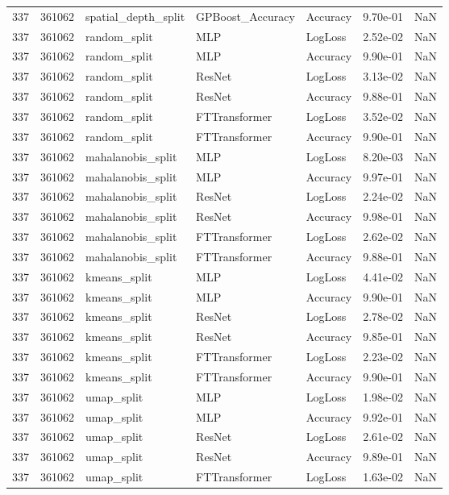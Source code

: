\begin{tabular}{rrlllrr}
337 & 361062 & spatial\_depth\_split & GPBoost\_Accuracy & Accuracy & 9.70e-01 & NaN \\
337 & 361062 & random\_split & MLP & LogLoss & 2.52e-02 & NaN \\
337 & 361062 & random\_split & MLP & Accuracy & 9.90e-01 & NaN \\
337 & 361062 & random\_split & ResNet & LogLoss & 3.13e-02 & NaN \\
337 & 361062 & random\_split & ResNet & Accuracy & 9.88e-01 & NaN \\
337 & 361062 & random\_split & FTTransformer & LogLoss & 3.52e-02 & NaN \\
337 & 361062 & random\_split & FTTransformer & Accuracy & 9.90e-01 & NaN \\
337 & 361062 & mahalanobis\_split & MLP & LogLoss & 8.20e-03 & NaN \\
337 & 361062 & mahalanobis\_split & MLP & Accuracy & 9.97e-01 & NaN \\
337 & 361062 & mahalanobis\_split & ResNet & LogLoss & 2.24e-02 & NaN \\
337 & 361062 & mahalanobis\_split & ResNet & Accuracy & 9.98e-01 & NaN \\
337 & 361062 & mahalanobis\_split & FTTransformer & LogLoss & 2.62e-02 & NaN \\
337 & 361062 & mahalanobis\_split & FTTransformer & Accuracy & 9.88e-01 & NaN \\
337 & 361062 & kmeans\_split & MLP & LogLoss & 4.41e-02 & NaN \\
337 & 361062 & kmeans\_split & MLP & Accuracy & 9.90e-01 & NaN \\
337 & 361062 & kmeans\_split & ResNet & LogLoss & 2.78e-02 & NaN \\
337 & 361062 & kmeans\_split & ResNet & Accuracy & 9.85e-01 & NaN \\
337 & 361062 & kmeans\_split & FTTransformer & LogLoss & 2.23e-02 & NaN \\
337 & 361062 & kmeans\_split & FTTransformer & Accuracy & 9.90e-01 & NaN \\
337 & 361062 & umap\_split & MLP & LogLoss & 1.98e-02 & NaN \\
337 & 361062 & umap\_split & MLP & Accuracy & 9.92e-01 & NaN \\
337 & 361062 & umap\_split & ResNet & LogLoss & 2.61e-02 & NaN \\
337 & 361062 & umap\_split & ResNet & Accuracy & 9.89e-01 & NaN \\
337 & 361062 & umap\_split & FTTransformer & LogLoss & 1.63e-02 & NaN \\

\end{tabular}
